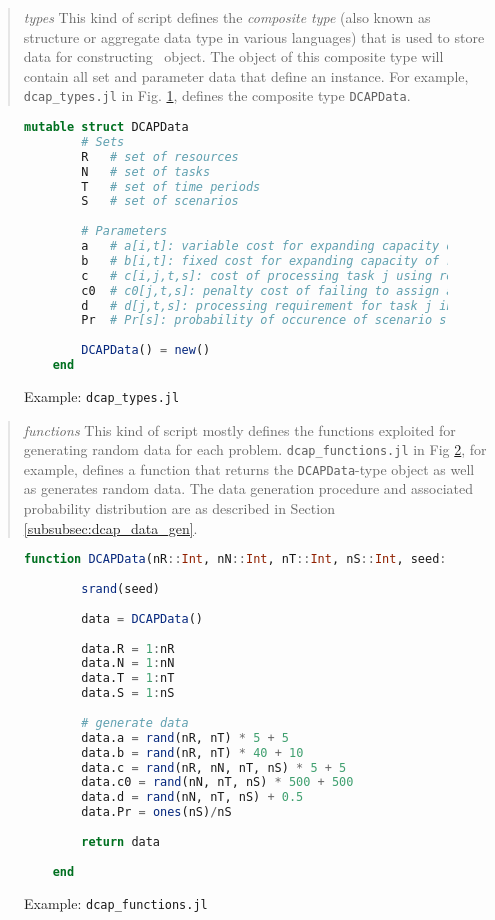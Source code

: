 \begin{quote}
\noindent\textit{types} This kind of script defines the \textit{composite type} (also known as structure or aggregate data type in various languages) that is used to store data for constructing \jumpmodel\ object. The object of this composite type will contain all set and parameter data that define an instance. For example, \texttt{dcap\_types.jl} in Fig. \ref{fig:dcap_types}, defines the composite type \texttt{DCAPData}.
\end{quote}
\begin{figure}[H]
	\centering
	\begin{lstlisting}[frame=single,language=julia]
	mutable struct DCAPData
		# Sets
		R   # set of resources 
		N   # set of tasks 
		T   # set of time periods 
		S   # set of scenarios 
		
		# Parameters
		a   # a[i,t]: variable cost for expanding capacity of resource i at time t
		b   # b[i,t]: fixed cost for expanding capacity of resource i at time t
		c   # c[i,j,t,s]: cost of processing task j using resource i in period t under scenario s
		c0  # c0[j,t,s]: penalty cost of failing to assign a resource to task j under scenario s
		d   # d[j,t,s]: processing requirement for task j in period t under scenario s
		Pr  # Pr[s]: probability of occurence of scenario s
	
		DCAPData() = new()
	end
	\end{lstlisting}
	\caption{Example: \texttt{dcap\_types.jl}}\label{fig:dcap_types}
\end{figure}

\begin{quote}
\noindent\textit{functions} This kind of script mostly defines the functions exploited for generating random data for each problem. \texttt{dcap\_functions.jl} in Fig \ref{fig:dcap_functions}, for example, defines a function that returns the \texttt{DCAPData}-type object as well as generates random data. The data generation procedure and associated probability distribution are as described in Section \ref{subsubsec:dcap_data_gen}.
\end{quote}
\begin{figure}[H]
	\centering
	\begin{lstlisting}[frame=single,language=julia]
	function DCAPData(nR::Int, nN::Int, nT::Int, nS::Int, seed::Int=1)::DCAPData
	
		srand(seed)
		
		data = DCAPData()
		
		data.R = 1:nR
		data.N = 1:nN
		data.T = 1:nT
		data.S = 1:nS
		
		# generate data
		data.a = rand(nR, nT) * 5 + 5
		data.b = rand(nR, nT) * 40 + 10
		data.c = rand(nR, nN, nT, nS) * 5 + 5
		data.c0 = rand(nN, nT, nS) * 500 + 500
		data.d = rand(nN, nT, nS) + 0.5
		data.Pr = ones(nS)/nS
		
		return data
		
	end
	\end{lstlisting}
	\caption{Example: \texttt{dcap\_functions.jl}}\label{fig:dcap_functions}
\end{figure}

